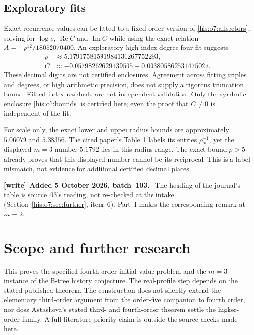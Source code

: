 \documentclass[11pt]{article}
\theoremstyle{remark}\newtheorem{remark}[theorem]{Remark}
\DeclareMathOperator{\Rea}{Re}
\DeclareMathOperator{\Ima}{Im}
\numberwithin{equation}{section}
\newenvironment{writenote}[1][]{\par\smallskip\begingroup\small
 \noindent\textbf{[write]}\if\relax\detokenize{#1}\relax\else~\textbf{#1.}\fi\ }%
 {\par\endgroup\smallskip}
\begin{document}
\subsection{Exploratory fits}
Exact recurrence values can be fitted to a fixed-order version of
\eqref{his:o7:allsectors}, solving for $\log\rho$, $\Rea C$ and $\Ima C$
while using the exact relation $A=-\rho^{12}/18052070400$.
An exploratory high-index degree-four fit suggests
\begin{align*}
\rho&\approx5.17917581591984130267752293,\\
C&\approx-0.05798262629139505+0.00380586253147502\,i.
\end{align*}
These decimal digits are not certified enclosures. Agreement across
fitting triples and degrees, or high arithmetic precision, does not
supply a rigorous truncation bound. Fitted-index residuals are not
independent validation. Only the symbolic enclosure \eqref{his:o7:bounds}
is certified here; even the proof that $C\ne0$ is independent of
the fit.

For scale only, the exact lower and upper radius bounds are
approximately $5.06079$ and $5.38356$. The cited paper's Table 1
labels its entries $\rho_m^{-1}$, yet the displayed $m=3$ number
$5.1792$ lies in this radius range. The exact bound $\rho>5$
already proves that this displayed number cannot be its reciprocal.
This is a label mismatch, not evidence for additional certified
decimal places.
\begin{writenote}[Added 5 October 2026, batch~103]
The heading of the journal's table is source~03's reading, not re-checked at the intake (Section~\ref{his:o7:sec:further}, item~6). Part~I makes the corresponding remark at $m=2$.
\end{writenote}


\section{Scope and further research}\label{his:o7:sec:scope}
This proves the specified fourth-order initial-value problem and
the $m=3$ instance of the B-tree history conjecture. The real-profile
step depends on the stated published theorem. The construction does
not silently extend the elementary third-order argument from the
order-five companion to fourth order, nor does Astashova's stated
third- and fourth-order theorem settle the higher-order family.
A full literature-priority claim is outside the source checks made
here.
\end{document}
